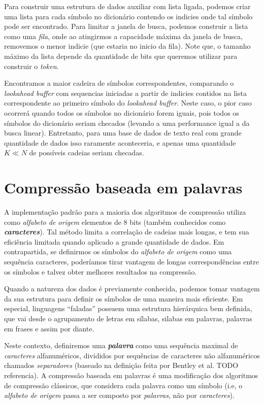 Para construir uma estrutura de dados auxiliar com lista ligada, podemos criar uma lista para cada símbolo no dicionário contendo os indicies onde tal símbolo pode ser encontrado.  
Para limitar a janela de busca, podemos construir a lista como uma \emph{fila}, onde ao atingirmos a capacidade máxima da janela de busca, removemos o menor indicie (que estaria no inicio da fila). Note que, o tamanho máximo da lista depende da quantidade de bits que queremos utilizar para construir o \emph{token}.

Encontramos a maior cadeira de símbolos correspondentes, comparando o \emph{lookahead buffer} com sequencias iniciadas a partir de indicies contidos na lista correspondente ao primeiro símbolo do \emph{lookahead buffer}.
Neste caso, o pior caso ocorrerá quando todos os símbolos no dicionário forem iguais, pois todos os símbolos do dicionário seriam checados (levando a uma performance igual a da busca linear).
Entretanto, para uma base de dados de texto real com grande quantidade de dados isso raramente aconteceria, e apenas uma quantidade $K \ll N$ de possíveis cadeias seriam checadas.

\section{Compressão baseada em palavras}
A implementação padrão para a maioria dos algoritmos de compressão utiliza como \emph{alfabeto de origem} elementos de 8 bits (também conhecidos como \textbf{\emph{caracteres}}).
Tal método limita a correlação de cadeias mais longas, e tem sua eficiência limitada quando aplicado a grande quantidade de dados. 
Em contrapartida, se definirmos os símbolos do \emph{alfabeto de origem} como uma sequência caracteres, poderíamos tirar vantagem de longas correspondências entre os símbolos e talvez obter melhores resultados na compressão.

Quando a natureza dos dados é previamente conhecida, podemos tomar vantagem da sua estrutura para definir os símbolos de uma maneira mais eficiente. 
Em especial, linguagens ``faladas'' possuem uma estrutura hierárquica bem definida, que vai desde o agrupamento de letras em sílabas, silabas em palavras, palavras em frases e assim por diante. 

Neste contexto, definiremos uma \textbf{\emph{palavra}} como uma sequência maximal de \emph{caracteres} alfanuméricos, divididos por sequências de caracteres não alfanuméricos chamados \emph{separadores} (baseado na definição feita por Bentley et al. TODO referencia).
A compressão baseada em palavras é uma modificação dos algoritmos de compressão clássicos, que considera cada palavra como um símbolo (i.e, o \emph{alfabeto de origem} passa a ser composto por \emph{palavras}, não por \emph{caracteres}).

